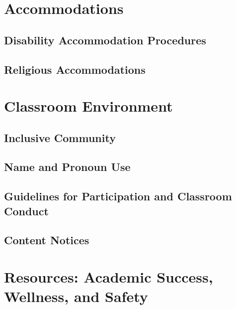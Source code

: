 \documentclass[11pt]{article}
\begin{document}
\section*{Accommodations}

\subsection*{Disability Accommodation Procedures}


\subsection*{Religious Accommodations}


\section*{Classroom Environment}

\subsection*{Inclusive Community}


\subsection*{Name and Pronoun Use}


\subsection*{Guidelines for Participation and Classroom Conduct}


\subsection*{Content Notices}


\section*{Resources: Academic Success, Wellness, and Safety}
\end{document}
